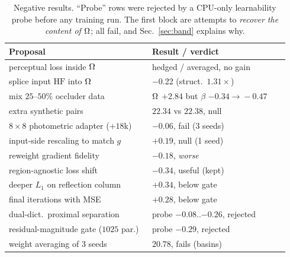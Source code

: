 \begin{table}[t]
\centering
\caption{Negative results. ``Probe'' rows were rejected by a CPU-only learnability probe
before any training run. The first block are attempts to \emph{recover the content of
$\Omega$}; all fail, and Sec.~\ref{sec:band} explains why.}
\label{tab:negative}
\footnotesize
\setlength{\tabcolsep}{3pt}
\begin{tabular}{@{}p{0.48\linewidth}p{0.46\linewidth}@{}}
\toprule
Proposal & Result / verdict \\
\midrule
perceptual loss inside $\Omega$ & hedged / averaged, no gain \\
splice input $\mathrm{HF}$ into $\Omega$ & $-$0.22 (struct.\ $1.31\times$) \\
mix $25$--$50\%$ occluder data & $\Omega$ $+2.84$ but $\beta$ $-0.34\!\to\!-0.47$ \\
extra synthetic pairs & $22.34$ vs $22.38$, null \\
\midrule
$8{\times}8$ photometric adapter ($+18$k) & $-0.06$, fail (3 seeds) \\
input-side rescaling to match $g$ & $+0.19$, null (1 seed) \\
reweight gradient fidelity & $-0.18$, \emph{worse} \\
region-agnostic loss shift & $-0.34$, useful (kept) \\
deeper $L_1$ on reflection column & $+0.34$, below gate \\
final iterations with MSE & $+0.28$, below gate \\
\midrule
dual-dict.\ proximal separation & probe $-0.08$..$-0.26$, rejected \\
residual-magnitude gate ($1025$ par.) & probe $-0.29$, rejected \\
weight averaging of 3 seeds & $20.78$, fails (basins) \\
\bottomrule
\end{tabular}
\end{table}

